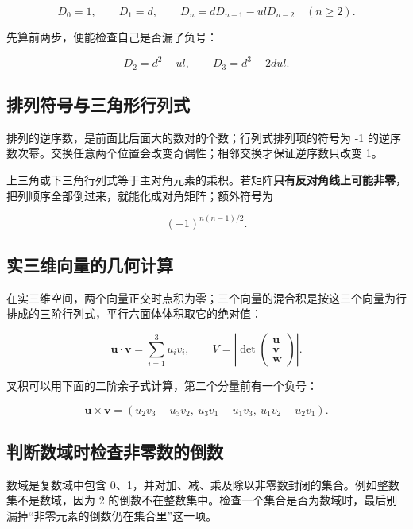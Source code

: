 \documentclass[
  11pt,
  a4paper,
  fontset=fandol]{ctexart}
\begin{document}
\[D_0=1,\qquad D_1=d,\qquad
D_n=dD_{n-1}-ulD_{n-2}\quad(n\ge2).\]

先算前两步，便能检查自己是否漏了负号：

\[D_2=d^2-ul,\qquad D_3=d^3-2dul.\]


\subsection{排列符号与三角形行列式}\label{ux6392ux5217ux7b26ux53f7ux4e0eux4e09ux89d2ux5f62ux884cux5217ux5f0f}

排列的逆序数，是前面比后面大的数对的个数；行列式排列项的符号为 -1
的逆序数次幂。交换任意两个位置会改变奇偶性；相邻交换才保证逆序数只改变
1。

上三角或下三角行列式等于主对角元素的乘积。若矩阵\textbf{只有反对角线上可能非零}，把列顺序全部倒过来，就能化成对角矩阵；额外符号为

\[(-1)^{n(n-1)/2}.\]


\subsection{实三维向量的几何计算}\label{ux5b9eux4e09ux7ef4ux5411ux91cfux7684ux51e0ux4f55ux8ba1ux7b97}

在实三维空间，两个向量正交时点积为零；三个向量的混合积是按这三个向量为行排成的三阶行列式，平行六面体体积取它的绝对值：

\[\boldsymbol u\cdot\boldsymbol v=\sum_{i=1}^{3}u_iv_i,\qquad
V=\left|\det\begin{pmatrix}\boldsymbol u\\\boldsymbol v\\\boldsymbol w\end{pmatrix}\right|.\]

叉积可以用下面的二阶余子式计算，第二个分量前有一个负号：

\[\boldsymbol u\times\boldsymbol v=
(u_2v_3-u_3v_2,\ u_3v_1-u_1v_3,\ u_1v_2-u_2v_1).\]


\subsection{判断数域时检查非零数的倒数}\label{ux5224ux65adux6570ux57dfux65f6ux68c0ux67e5ux975eux96f6ux6570ux7684ux5012ux6570}

数域是复数域中包含
0、1，并对加、减、乘及除以非零数封闭的集合。例如整数集不是数域，因为 2
的倒数不在整数集中。检查一个集合是否为数域时，最后别漏掉``非零元素的倒数仍在集合里''这一项。
\end{document}
